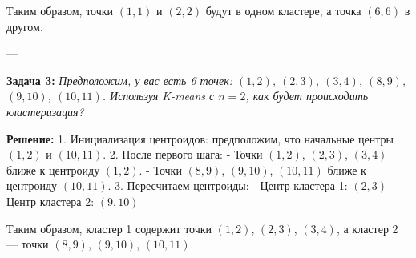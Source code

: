 Таким образом, точки $(1, 1)$ и $(2, 2)$ будут в одном кластере, а точка $(6, 6)$ в другом.

---

\textbf{Задача 3:} \textit{Предположим, у вас есть 6 точек: $(1, 2)$, $(2, 3)$, $(3, 4)$, $(8, 9)$, $(9, 10)$, $(10, 11)$. Используя K-means с $n=2$, как будет происходить кластеризация?}

\textbf{Решение:}  
1. Инициализация центроидов: предположим, что начальные центры $(1, 2)$ и $(10, 11)$.
2. После первого шага:
   - Точки $(1, 2)$, $(2, 3)$, $(3, 4)$ ближе к центроиду $(1, 2)$.
   - Точки $(8, 9)$, $(9, 10)$, $(10, 11)$ ближе к центроиду $(10, 11)$.
3. Пересчитаем центроиды:
   - Центр кластера 1: $(2, 3)$
   - Центр кластера 2: $(9, 10)$

Таким образом, кластер 1 содержит точки $(1, 2)$, $(2, 3)$, $(3, 4)$, а кластер 2 — точки $(8, 9)$, $(9, 10)$, $(10, 11)$.

